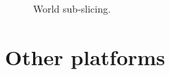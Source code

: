 \documentclass[11pt,oneside,a4paper,openright]{report}
\begin{document}
\begin{figure}[h!]
\centering
\setlength\fboxsep{0pt}
\setlength\fboxrule{0.5pt}
\caption{ World sub-slicing.}
\label{fig:Pandora2}
\end{figure}

 
\section{Other platforms}
\end{document}
